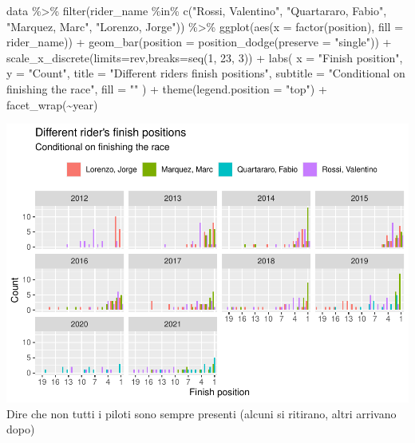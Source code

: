\documentclass[
]{article}
\newenvironment{Shaded}{\begin{snugshade}}{\end{snugshade}}
\newcommand{\AttributeTok}[1]{\textcolor[rgb]{0.77,0.63,0.00}{#1}}
\newcommand{\DecValTok}[1]{\textcolor[rgb]{0.00,0.00,0.81}{#1}}
\newcommand{\FunctionTok}[1]{\textcolor[rgb]{0.00,0.00,0.00}{#1}}
\newcommand{\NormalTok}[1]{#1}
\newcommand{\SpecialCharTok}[1]{\textcolor[rgb]{0.00,0.00,0.00}{#1}}
\newcommand{\StringTok}[1]{\textcolor[rgb]{0.31,0.60,0.02}{#1}}
\begin{document}
\begin{Shaded}
\begin{Highlighting}[]
\NormalTok{data }\SpecialCharTok{\%\textgreater{}\%}
  \FunctionTok{filter}\NormalTok{(rider\_name }\SpecialCharTok{\%in\%} \FunctionTok{c}\NormalTok{(}\StringTok{"Rossi, Valentino"}\NormalTok{, }\StringTok{"Quartararo, Fabio"}\NormalTok{, }\StringTok{"Marquez, Marc"}\NormalTok{, }\StringTok{"Lorenzo, Jorge"}\NormalTok{)) }\SpecialCharTok{\%\textgreater{}\%}
  \FunctionTok{ggplot}\NormalTok{(}\FunctionTok{aes}\NormalTok{(}\AttributeTok{x =} \FunctionTok{factor}\NormalTok{(position), }\AttributeTok{fill =}\NormalTok{ rider\_name)) }\SpecialCharTok{+}
  \FunctionTok{geom\_bar}\NormalTok{(}\AttributeTok{position =} \FunctionTok{position\_dodge}\NormalTok{(}\AttributeTok{preserve =} \StringTok{"single"}\NormalTok{)) }\SpecialCharTok{+}
  \FunctionTok{scale\_x\_discrete}\NormalTok{(}\AttributeTok{limits=}\NormalTok{rev,}\AttributeTok{breaks=}\FunctionTok{seq}\NormalTok{(}\DecValTok{1}\NormalTok{, }\DecValTok{23}\NormalTok{, }\DecValTok{3}\NormalTok{)) }\SpecialCharTok{+}
  \FunctionTok{labs}\NormalTok{(}
    \AttributeTok{x =} \StringTok{"Finish position"}\NormalTok{,}
    \AttributeTok{y =} \StringTok{"Count"}\NormalTok{,}
    \AttributeTok{title =} \StringTok{"Different rider\textquotesingle{}s finish positions"}\NormalTok{,}
    \AttributeTok{subtitle =} \StringTok{"Conditional on finishing the race"}\NormalTok{,}
    \AttributeTok{fill =} \StringTok{""}
\NormalTok{  ) }\SpecialCharTok{+}
  \FunctionTok{theme}\NormalTok{(}\AttributeTok{legend.position =} \StringTok{"top"}\NormalTok{) }\SpecialCharTok{+}
  \FunctionTok{facet\_wrap}\NormalTok{(}\SpecialCharTok{\textasciitilde{}}\NormalTok{year)}
\end{Highlighting}
\end{Shaded}

\includegraphics{Project_files/figure-latex/unnamed-chunk-5-1.pdf} Dire
che non tutti i piloti sono sempre presenti (alcuni si ritirano, altri
arrivano dopo)
\end{document}

